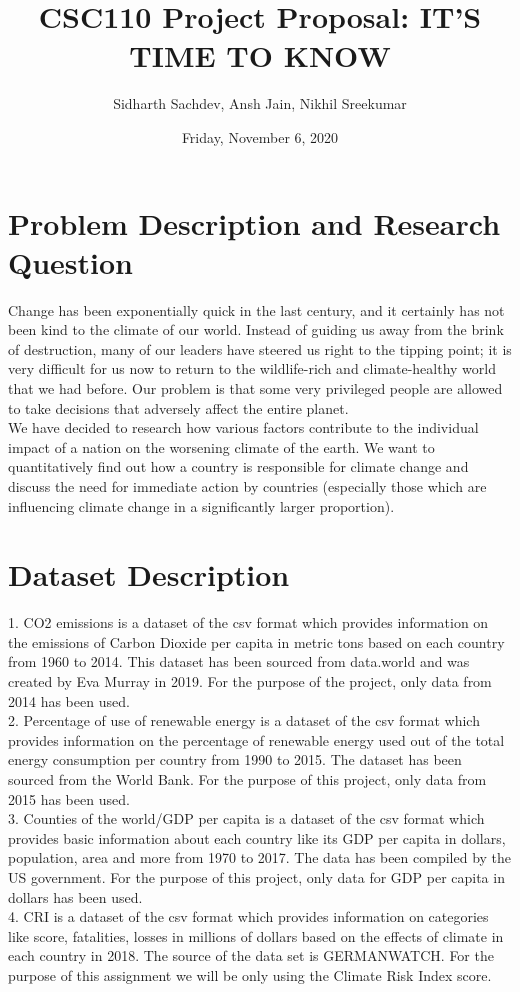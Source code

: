 \documentclass[fontsize=11pt]{article}
\title{CSC110 Project Proposal: IT'S TIME TO KNOW}
\author{Sidharth Sachdev, Ansh Jain, Nikhil Sreekumar}
\date{Friday, November 6, 2020}
\begin{document}
\maketitle

\section*{Problem Description and Research Question}

Change has been exponentially quick in the last century, and it certainly has not been kind to the climate of our world. Instead of guiding us away from the brink of destruction, many of our leaders have steered us right to the tipping point; it is very difficult for us now to return to the wildlife-rich and climate-healthy world that we had before. Our problem is that some very privileged people are allowed to take decisions that adversely affect the entire planet.
\\ We have decided to research how various factors contribute to the individual impact of a nation on the worsening climate of the earth. We want to quantitatively find out how a country is responsible for climate change and discuss the need for immediate action by countries (especially those which are influencing climate change in a significantly larger proportion).

\section*{Dataset Description}

1. CO2 emissions is a dataset of the csv format which provides information on the emissions of Carbon Dioxide per capita in metric tons based on each country from 1960 to 2014. This dataset has been sourced from data.world and was created by Eva Murray in 2019. For the purpose of the project, only data from 2014 has been used. \\
2. Percentage of use of renewable energy is a dataset of the csv format which provides information on the percentage of  renewable energy used out of the total energy consumption per country from 1990 to 2015. The dataset has been sourced from the World Bank. For the purpose of this project, only data from 2015 has been used. \\
3. Counties of the world/GDP per capita is a dataset of the csv format which provides basic information about each country like its GDP per capita in dollars, population, area and more from 1970 to 2017. The data has been compiled by the US government. For the purpose of this project, only data for GDP per capita in dollars has been used. \\
4. CRI is a dataset of the csv format which provides information on categories like score, fatalities, losses in millions of dollars based on the effects of climate in each country in 2018. The source of the data set is GERMANWATCH. For the purpose of this assignment we will be only using the Climate Risk Index score. 
\end{document}

